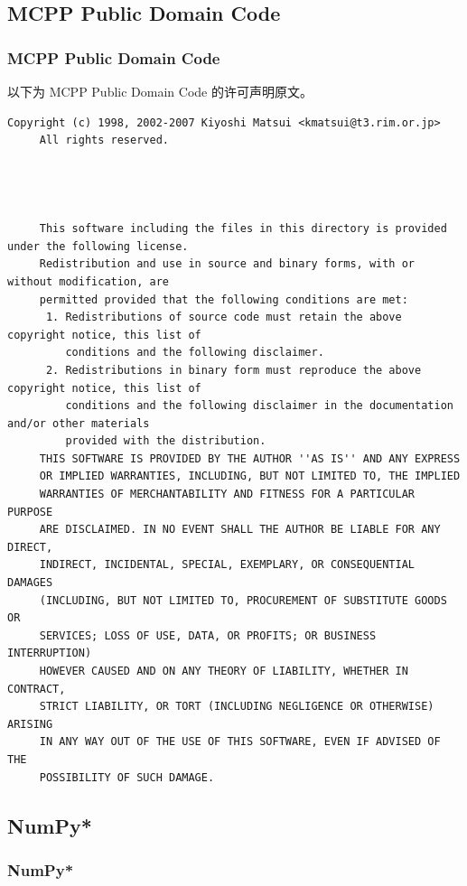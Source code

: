 \subsection{MCPP Public Domain Code}
\subsubsection*{MCPP Public Domain Code}

以下为 MCPP Public Domain Code 的许可声明原文。

\begin{lstlisting}[basicstyle=\ttfamily\footnotesize,breaklines=true]
     Copyright (c) 1998, 2002-2007 Kiyoshi Matsui <kmatsui@t3.rim.or.jp>
     All rights reserved.




     This software including the files in this directory is provided under the following license.
     Redistribution and use in source and binary forms, with or without modification, are
     permitted provided that the following conditions are met:
      1. Redistributions of source code must retain the above copyright notice, this list of
         conditions and the following disclaimer.
      2. Redistributions in binary form must reproduce the above copyright notice, this list of
         conditions and the following disclaimer in the documentation and/or other materials
         provided with the distribution.
     THIS SOFTWARE IS PROVIDED BY THE AUTHOR ''AS IS'' AND ANY EXPRESS
     OR IMPLIED WARRANTIES, INCLUDING, BUT NOT LIMITED TO, THE IMPLIED
     WARRANTIES OF MERCHANTABILITY AND FITNESS FOR A PARTICULAR PURPOSE
     ARE DISCLAIMED. IN NO EVENT SHALL THE AUTHOR BE LIABLE FOR ANY DIRECT,
     INDIRECT, INCIDENTAL, SPECIAL, EXEMPLARY, OR CONSEQUENTIAL DAMAGES
     (INCLUDING, BUT NOT LIMITED TO, PROCUREMENT OF SUBSTITUTE GOODS OR
     SERVICES; LOSS OF USE, DATA, OR PROFITS; OR BUSINESS INTERRUPTION)
     HOWEVER CAUSED AND ON ANY THEORY OF LIABILITY, WHETHER IN CONTRACT,
     STRICT LIABILITY, OR TORT (INCLUDING NEGLIGENCE OR OTHERWISE) ARISING
     IN ANY WAY OUT OF THE USE OF THIS SOFTWARE, EVEN IF ADVISED OF THE
     POSSIBILITY OF SUCH DAMAGE.
\end{lstlisting}

\subsection{NumPy*}
\subsubsection*{NumPy*}

